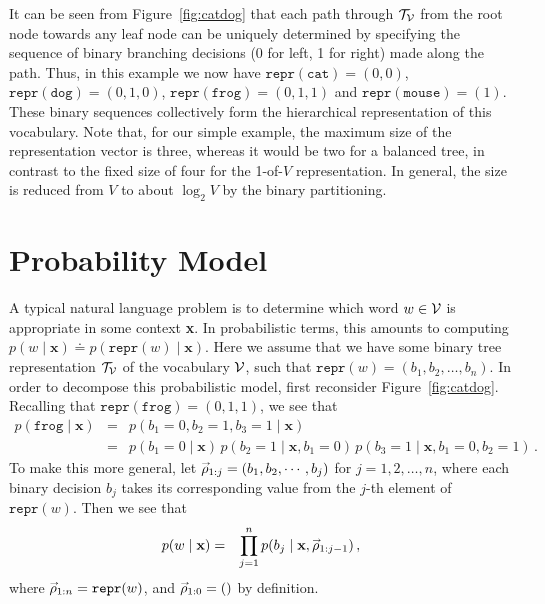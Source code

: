 \documentclass[a4paper]{article}
\newcommand{\rvec}[1]{\accentset{\rightarrow}{#1}}
\begin{document}
It can be seen from Figure~\ref{fig:catdog} that each path through ${\cal T}_{\cal V}$ 
from the root node towards any leaf node
can be uniquely determined by specifying the 
sequence of binary branching decisions (0 for left, 1 for right) made along the path.
Thus, in this example we now have $\texttt{repr}(\texttt{cat})=(0,0)$, 
$\texttt{repr}(\texttt{dog})=(0,1,0)$, $\texttt{repr}(\texttt{frog})=(0,1,1)$
and $\texttt{repr}(\texttt{mouse})=(1)$.
These binary sequences collectively form the hierarchical representation of this vocabulary.
Note that, for our simple example, the maximum size of the representation vector is three, whereas it would be two for a balanced tree,
in contrast to the fixed size of four for the 1-of-$V$ representation.
In general, the size is reduced from $V$ to about $\log_2 V$ by the binary partitioning.

\section{Probability Model}

A typical natural language problem is to determine which word $w\in{\cal V}$ is appropriate in some context
\textbf{x}. In probabilistic terms, this amounts to computing $p(w\;|\;\textbf{x})\doteq p(\texttt{repr}(w)\;|\;\textbf{x})$.
Here we assume that we have some binary tree representation ${\cal T}_{\cal V}$ of the vocabulary ${\cal V}$,
such that $\texttt{repr}(w)=(b_1,b_2,\ldots,b_n)$.
In order to decompose this probabilistic model, first reconsider Figure~\ref{fig:catdog}.
Recalling that $\texttt{repr}(\texttt{frog})=(0,1,1)$, we see that
\begin{eqnarray}
p(\texttt{frog}\;|\;\textbf{x})
& = & p(b_1=0,b_2=1,b_3=1\;|\;\textbf{x})
\nonumber\\
& = & p(b_1=0\;|\;\textbf{x})\,p(b_2=1\;|\;\textbf{x},b_1=0)\,
p(b_3=1\;|\;\textbf{x},b_1=0,b_2=1)
\,.\nonumber
\end{eqnarray}
To make this more general, let $\rvec{\rho}_{1:j}=(b_1, b_2, \cdots, b_j)$ for $j=1,2,\ldots,n$,
where each binary decision $b_j$ takes its corresponding value from the $j$-th element of $\texttt{repr}(w)$.
Then we see that
\begin{eqnarray}
p(w\;|\;\textbf{x})
& = & \prod_{j=1}^n p(b_j\;|\;\textbf{x},\rvec{\rho}_{1:j-1})\,,
\label{eq:p:word}
\end{eqnarray}
where $\rvec{\rho}_{1:n}=\texttt{repr}(w)$, and $\rvec{\rho}_{1:0}=()$ by definition.
\end{document}
